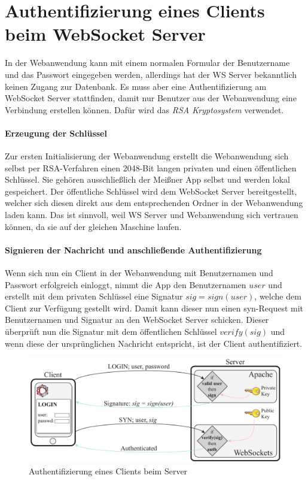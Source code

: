 
\section{Authentifizierung eines Clients beim WebSocket Server}
In der Webanwendung kann mit einem normalen Formular der Benutzername und das Passwort eingegeben werden, allerdings hat der WS Server bekanntlich keinen Zugang zur Datenbank. Es muss aber eine Authentifizierung am WebSocket Server stattfinden, damit nur Benutzer aus der Webanwendung eine Verbindung erstellen können. Dafür wird das \emph{RSA Kryptosystem} verwendet.

\paragraph{Erzeugung der Schlüssel}
Zur ersten Initialisierung der Webanwendung erstellt die Webanwendung sich selbst per RSA-Verfahren einen 2048-Bit langen privaten und einen öffentlichen Schlüssel. Sie gehören ausschließlich der Meißner App selbst und werden lokal gespeichert. Der öffentliche Schlüssel wird dem WebSocket Server bereitgestellt, welcher sich diesen direkt aus dem entsprechenden Ordner in der Webanwendung laden kann. Das ist sinnvoll, weil WS Server und Webanwendung sich vertrauen können, da sie auf der gleichen Maschine laufen.

\paragraph{Signieren der Nachricht und anschließende Authentifizierung}
Wenn sich nun ein Client in der Webanwendung mit Benutzernamen und Passwort erfolgreich einloggt, nimmt die App den Benutzernamen $user$ und erstellt mit dem privaten Schlüssel eine Signatur $sig = sign(user)$, welche dem Client zur Verfügung gestellt wird. Damit kann dieser nun einen syn-Request mit Benutzernamen und Signatur an den WebSocket Server schicken. Dieser überprüft nun die Signatur mit dem öffentlichen Schlüssel $verify(sig)$ und wenn diese der ursprünglichen Nachricht entspricht, ist der Client authentifiziert.

\begin{figure}[!ht]
	\centering
	\includegraphics[width=15cm]{fig/publicprivate}
	\caption{Authentifizierung eines Clients beim Server}
\end{figure}

